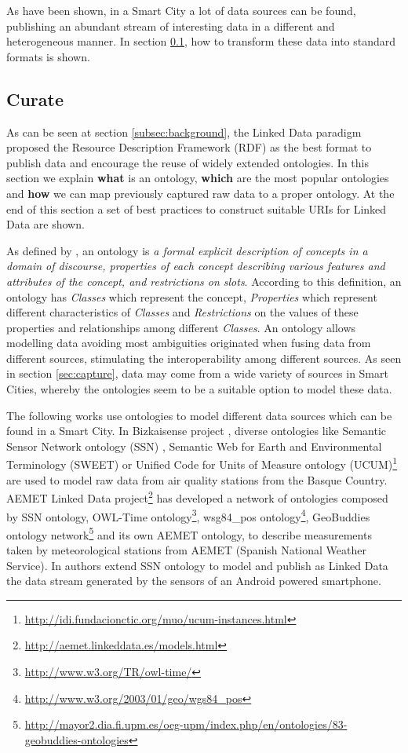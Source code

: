As have been shown, in a Smart City a lot of data sources can be found, publishing an abundant stream of interesting data in a different and heterogeneous manner. In section \ref{subsec:process}, how to transform these data into standard formats is shown.

\subsection{Curate}
\label{subsec:process}

As can be seen at section \ref{subsec:background}, the Linked Data  paradigm proposed the Resource Description Framework (RDF) as the best format to publish data and encourage the reuse of widely extended ontologies. In this section we explain \textbf{what} is an ontology, \textbf{which} are the most popular ontologies and \textbf{how} we can map previously captured raw data to a proper ontology. At the end of this section a set of best practices to construct suitable URIs for Linked Data are shown.

As defined by \cite{noy_ontology_2001}, an ontology is \textit{a formal explicit description of concepts in a domain of discourse, properties of each concept describing various features and attributes of the concept, and restrictions on slots}. According to this definition, an ontology has \textit{Classes} which represent the concept, \textit{Properties} which represent different characteristics of \textit{Classes} and \textit{Restrictions} on the values of these properties and relationships among different \textit{Classes}. An ontology allows modelling data avoiding most ambiguities originated when fusing data from different sources, stimulating the interoperability among different sources. As seen in section \ref{sec:capture}, data may come from a wide variety of sources in Smart Cities, whereby the ontologies seem to be a suitable option to model these data.

The following works use ontologies  to model different data sources which can be found in a Smart City. In Bizkaisense project \cite{emaldi_short_2012}, diverse ontologies like Semantic Sensor Network ontology (SSN) \cite{lefort_semantic_2011}, Semantic Web for Earth and Environmental Terminology (SWEET) \cite{raskin_knowledge_2005} or Unified Code for Units of Measure ontology (UCUM)\footnote{\url{http://idi.fundacionctic.org/muo/ucum-instances.html}} are used to model raw data from air quality stations from the Basque Country. AEMET Linked Data project\footnote{\url{http://aemet.linkeddata.es/models.html}} has developed a network of ontologies composed by SSN ontology, OWL-Time ontology\footnote{\url{http://www.w3.org/TR/owl-time/}}, wsg84\_pos ontology\footnote{\url{http://www.w3.org/2003/01/geo/wgs84_pos}}, GeoBuddies ontology network\footnote{\url{http://mayor2.dia.fi.upm.es/oeg-upm/index.php/en/ontologies/83-geobuddies-ontologies}} and its own AEMET ontology, to describe measurements taken by meteorological stations from AEMET (Spanish National Weather Service). In \cite{d2011enabling} authors extend SSN ontology to model and publish as Linked Data the data stream generated by the sensors of an Android powered smartphone.

